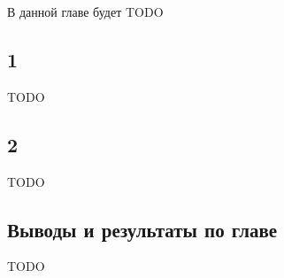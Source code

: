 \documentclass[../diploma.tex]{subfiles}
\begin{document}
\label{sec:1}

В данной главе будет TODO

\subsection{1}

TODO \cite{example}

\subsection{2}

TODO

\subsection{Выводы и результаты по главе}

TODO
\end{document}
